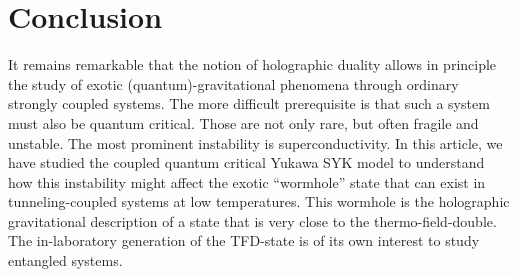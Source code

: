 

\section{Conclusion}
\label{sec:conclusion}

It remains remarkable that the notion of holographic duality allows in principle the study of exotic (quantum)-gravitational phenomena through ordinary strongly coupled systems. The more difficult prerequisite is that such a system must also be quantum critical. Those are not only rare, but often fragile and unstable. The most prominent instability is superconductivity. In this article, we have studied the coupled quantum critical Yukawa SYK model to understand how this instability might affect the exotic ``wormhole'' state that can exist in tunneling-coupled systems at low temperatures. This wormhole is the holographic gravitational description of a state that is very close to the thermo-field-double. The in-laboratory generation of the TFD-state is of its own interest to study entangled systems.  

